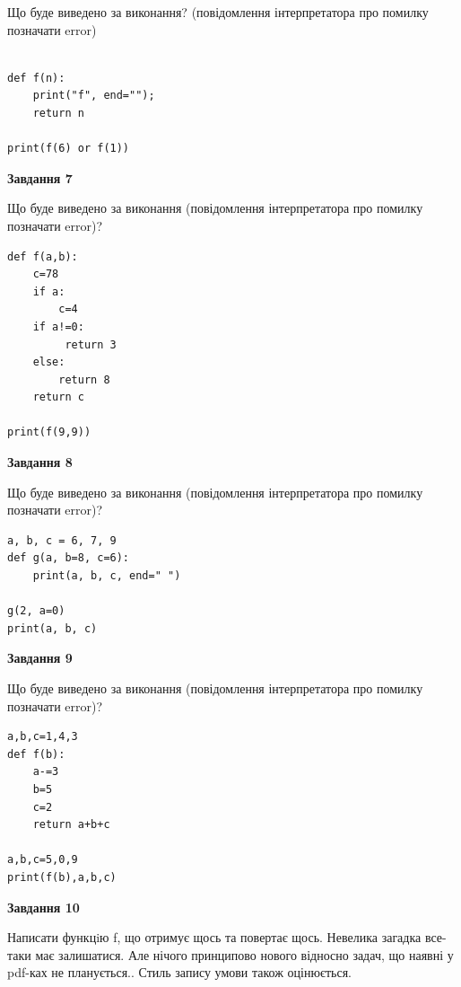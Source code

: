 \documentclass[12pt, ukrainian]{article}
\begin{document}
{\begin {large}
Що буде виведено за виконання? (повідомлення інтерпретатора про помилку позначати error)\par
\begin{verbatim}

def f(n):
    print("f", end="");
    return n

print(f(6) or f(1))
\end{verbatim}

{\begin {center}\textbf{Завдання 7}\end {center}}

Що буде виведено за виконання (повідомлення інтерпретатора про помилку позначати error)?\par
\begin{verbatim}
def f(a,b):
    c=78
    if a:
        c=4
    if a!=0:
         return 3
    else: 
        return 8
    return c

print(f(9,9))
\end{verbatim}

{\begin {center}\textbf{Завдання 8}\end {center}}

Що буде виведено за виконання (повідомлення інтерпретатора про помилку позначати error)?\par
\begin{verbatim}
a, b, c = 6, 7, 9
def g(a, b=8, c=6):
    print(a, b, c, end=" ")

g(2, a=0)
print(a, b, c)
\end{verbatim}

{\begin {center}\textbf{Завдання 9}\end {center}}

Що буде виведено за виконання (повідомлення інтерпретатора про помилку позначати error)?\par
\begin{verbatim}
a,b,c=1,4,3
def f(b):
    a-=3
    b=5
    c=2
    return a+b+c

a,b,c=5,0,9
print(f(b),a,b,c)
\end{verbatim}

{\begin {center}\textbf{Завдання 10}\end {center}}


Написати функцiю f, що отримує щось та повертає щось. Невелика загадка все-таки має залишатися. Але нічого принципово нового відносно задач, що наявні у pdf-ках не планується.. Стиль запису умови також оцінюється.\par
\end {large}}
\newpage
\end{document}
